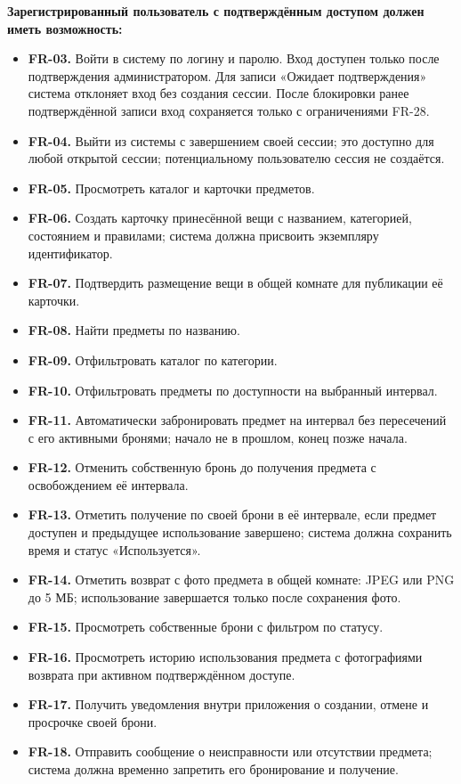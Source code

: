 \documentclass[a4paper,12pt]{article}
\begin{document}
\par\noindent\textbf{Зарегистрированный пользователь с подтверждённым доступом должен иметь возможность:}
\begin{itemize}[itemsep=0pt]
\item \textbf{FR-03.} Войти в систему по логину и паролю. Вход доступен только после подтверждения администратором. Для записи «Ожидает подтверждения» система отклоняет вход без создания сессии. После блокировки ранее подтверждённой записи вход сохраняется только с ограничениями FR-28.
\item \textbf{FR-04.} Выйти из системы с завершением своей сессии; это доступно для любой открытой сессии; потенциальному пользователю сессия не создаётся.
\item \textbf{FR-05.} Просмотреть каталог и карточки предметов.
\item \textbf{FR-06.} Создать карточку принесённой вещи с названием, категорией, состоянием и правилами; система должна присвоить экземпляру идентификатор.
\item \textbf{FR-07.} Подтвердить размещение вещи в общей комнате для публикации её карточки.
\item \textbf{FR-08.} Найти предметы по названию.
\item \textbf{FR-09.} Отфильтровать каталог по категории.
\item \textbf{FR-10.} Отфильтровать предметы по доступности на выбранный интервал.
\item \textbf{FR-11.} Автоматически забронировать предмет на интервал без пересечений с его активными бронями; начало не в прошлом, конец позже начала.
\item \textbf{FR-12.} Отменить собственную бронь до получения предмета с освобождением её интервала.
\item \textbf{FR-13.} Отметить получение по своей брони в её интервале, если предмет доступен и предыдущее использование завершено; система должна сохранить время и статус «Используется».
\item \textbf{FR-14.} Отметить возврат с фото предмета в общей комнате: JPEG или PNG до 5 МБ; использование завершается только после сохранения фото.
\item \textbf{FR-15.} Просмотреть собственные брони с фильтром по статусу.
\item \textbf{FR-16.} Просмотреть историю использования предмета с фотографиями возврата при активном подтверждённом доступе.
\item \textbf{FR-17.} Получить уведомления внутри приложения о создании, отмене и просрочке своей брони.
\item \textbf{FR-18.} Отправить сообщение о неисправности или отсутствии предмета; система должна временно запретить его бронирование и получение.
\end{itemize}
\end{document}
